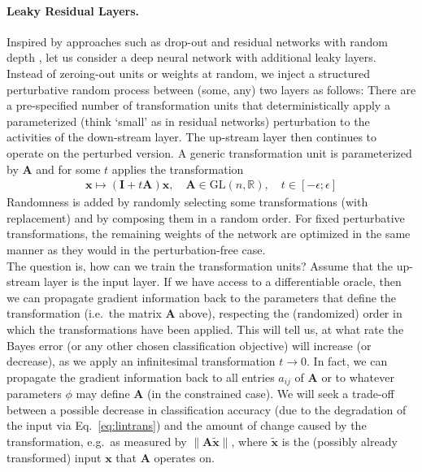 \documentclass{article}
\newcommand{\mat}[1]{{\mathbf #1}}
\newcommand{\x}{{\mathbf x}}
\renewcommand{\Re}{{\mathbb R}}
\begin{document}
\paragraph{Leaky Residual Layers.} Inspired by approaches such as drop-out \cite{srivastava2014dropout} and residual networks \cite{he2016deep} with random depth \cite{huang2016deep}, let us consider a deep neural network with additional leaky layers. Instead of zeroing-out units or weights at random, we inject a structured perturbative random process between (some, any) two layers as follows: There are a pre-specified number of transformation units that deterministically apply a parameterized (think `small' as in residual networks) perturbation to the activities of the down-stream layer. The up-stream layer then continues to operate on the perturbed version. A generic transformation unit is parameterized by $\mat A$ and for some $t$ applies the transformation 
\begin{align}
\x \mapsto (\mat I + t \mat A) \x, \quad \mat A \in \text{GL}(n,\Re), \quad t \in [-\epsilon; \epsilon] 
\label{eq:lintrans}
\end{align}
Randomness is added by randomly selecting some transformations (with replacement) and by composing them in a random order. For fixed perturbative transformations, the remaining weights of the network are optimized in the same manner as they would in the perturbation-free case. \\

The question is, how can we train the transformation units? Assume that the up-stream layer is the input layer. If we have access to a differentiable oracle, then we can propagate gradient information back to the parameters that define the transformation (i.e.~the matrix $\mat A$ above), respecting the (randomized) order in which the transformations have been applied. This will tell us, at what rate the Bayes error (or any other chosen classification objective) will increase (or decrease), as we apply an infinitesimal transformation $t \to 0$. In fact, we can propagate the gradient information back to all entries $a_{ij}$ of $\mat A$ or to whatever parameters $\phi$  may define $\mat A$ (in the constrained case). We will seek a trade-off between a possible decrease in classification accuracy (due to the degradation of the input via Eq.~\eqref{eq:lintrans}) and the amount of change caused by the transformation, e.g.~as measured by $\| \mat A \tilde \x\|$, where $\tilde \x$ is the (possibly already transformed) input $\x$ that $\mat A$ operates on. \\
\end{document}
